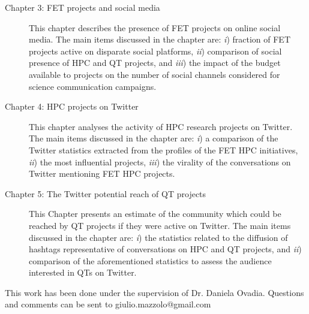 \begin{description}
 \item[Chapter 3: FET projects and social media] This chapter describes the presence of FET projects on online social media. The main items discussed in the chapter are: \emph{i}) fraction of FET projects active on disparate social platforms, \emph{ii}) comparison of social presence of HPC and QT projects, and \emph{iii}) the impact of the budget available to projects on the number of social channels considered for science communication campaigns.

 \item[Chapter 4: HPC projects on Twitter] This chapter analyses the activity of HPC research projects on Twitter. The main items discussed in the chapter are: \emph{i}) a comparison of the Twitter statistics extracted from the profiles of the FET HPC initiatives, \emph{ii}) the most influential projects, \emph{iii}) the virality of the conversations on Twitter mentioning FET HPC projects.

 \item[Chapter 5: The Twitter potential reach of QT projects] This Chapter presents an estimate of the community which could be reached by QT projects if they were active on Twitter. The main items discussed in the chapter are: \emph{i}) the statistics related to the diffusion of hashtags representative of conversations on HPC and QT projects, and \emph{ii}) comparison of the aforementioned statistics to assess the audience interested in QTs on Twitter.
\end{description}

\noindent
This work has been done under the supervision of Dr. Daniela Ovadia. Questions and comments can be sent to giulio.mazzolo@gmail.com